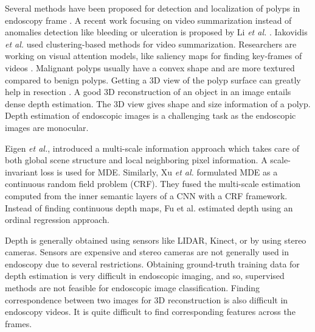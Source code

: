 \documentclass[journal]{IEEEtran}
\begin{document}
Several methods have been proposed for detection and localization of polyps in endoscopy frame \cite{li2012comparison}\cite{tjoa2002automated}.
A recent work focusing on video summarization instead of anomalies detection like bleeding or ulceration is proposed by Li \textit{et al.} \cite{li2010wireless}. Iakovidis \textit{et al.} \cite{iakovidis2010reduction} used clustering-based methods for video summarization. Researchers are working on visual attention models, like saliency maps for finding key-frames of videos \cite{hua2005generic}. 
Malignant polyps usually have a convex shape and are more textured compared to benign polyps. Getting a 3D view of the polyp surface can greatly help in resection \cite{law2016endoscopic}. A good 3D reconstruction of an object in an image entails dense depth estimation. The 3D view gives shape and size information of a polyp. Depth estimation of endoscopic images is a challenging task as the endoscopic images are monocular. 

Eigen \textit{et al.}, \cite{eigen2014depth} introduced a  multi-scale information approach which takes care of both global scene structure and local neighboring pixel information. A scale-invariant loss is used for MDE. Similarly, Xu \textit{et al.} \cite{ricci2018monocular} formulated MDE as a continuous random field problem (CRF). They fused the multi-scale estimation computed from the inner semantic layers of a CNN with a CRF framework. Instead of finding continuous depth maps, Fu et al.  \cite{fu2018deep} estimated depth using an ordinal regression approach.

Depth is generally obtained using sensors like LIDAR, Kinect, or by using stereo cameras. Sensors are expensive and stereo cameras are not generally used in endoscopy due to several restrictions. Obtaining ground-truth training data for depth estimation is very difficult in endoscopic imaging, and so, supervised methods are not feasible for endoscopic image classification. Finding correspondence between two images for 3D reconstruction is also difficult in endoscopy videos. It is quite difficult to find corresponding features across the frames.
\end{document}
